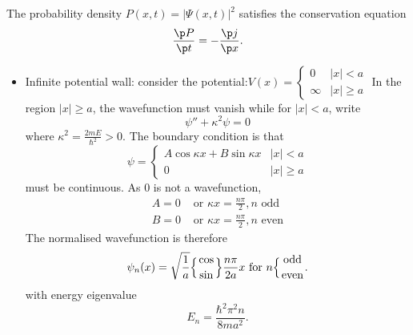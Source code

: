 \documentclass[a4paper]{article}
\theoremstyle{definition}
\begin{document}
\begin{proposition}
  The probability density \(P(x,t) = |\Psi(x,t)|^2\) satisfies the conservation equation
  \[
    \frac{\p P}{\p t} = - \frac{\p j}{\p x}.
  \]
\end{proposition}

\begin{eg}\leavevmode
\begin{itemize}
\item Infinite potential wall: consider the potential:\(V(x)=
  \begin{cases}
    0 & |x| < a \\
    \infty & |x| \geq a
  \end{cases}
  \) In the region \(|x| \geq a\), the wavefunction must vanish while for \(|x| < a\), write
  \[
\psi'' + \kappa^2 \psi =0
\]
where \(\kappa^2=\frac{2mE}{\hbar^2} > 0\). The boundary condition is that
\[
  \psi =
  \begin{cases}
    A\cos \kappa x + B\sin \kappa x & |x| < a \\
    0 & |x| \geq a
  \end{cases}
\]
must be continuous. As \(0\) is not a wavefunction,
\begin{align*}
  A=0 &\text{ or } \kappa x = \frac{n\pi}{2}, n \text{ odd} \\
  B=0 &\text{ or } \kappa x = \frac{n\pi}{2}, n \text{ even}
\end{align*}
The normalised wavefunction is therefore
\[
\psi_n(x) = \sqrt \frac{1}{a} \Big\{ {\cos \atop \sin} \Big\} \frac{n\pi}{2a} x \text{ for } n \Big\{ {\text{odd} \atop \text{even}}.
\]
with energy eigenvalue
\[
E_n = \frac{\hbar^2\pi^2n}{8ma^2}.
\]


\end{itemize}
\end{eg}
\end{document}
